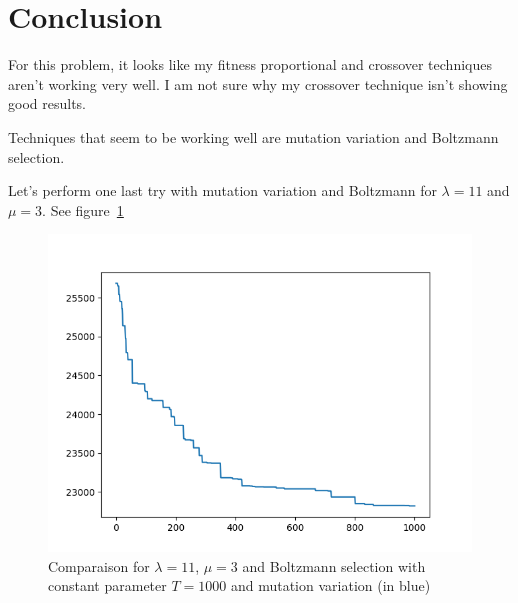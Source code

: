 \documentclass{article}
\theoremstyle{plain} %
\theoremstyle{definition} %
\begin{document}
\section{Conclusion}

For this problem, it looks like my fitness proportional and crossover
techniques aren't working very well. I am not sure why my crossover technique
isn't showing good results.

Techniques that seem to be working well are mutation variation and Boltzmann
selection.

Let's perform one last try with mutation variation and Boltzmann for $\lambda
= 11 $ and $\mu = 3$. See figure~\ref{MutationBoltzmann}

\begin{figure}
\centering
\includegraphics[scale=.6]{Plots_Antoine/new/11,3,mut,Boltzmann.png}
\caption{Comparaison for $\lambda = 11$, $\mu = 3$ and Boltzmann selection with
constant parameter $T = 1000$ and mutation variation (in blue)}
\label{MutationBoltzmann}
\end{figure}
\end{document}
